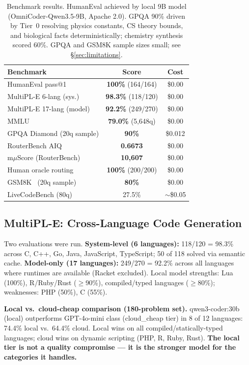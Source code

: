 \documentclass[11pt]{article}
\begin{document}
\begin{table}[t]
\centering
\small
\begin{tabular}{lcc}
\toprule
\textbf{Benchmark} & \textbf{Score} & \textbf{Cost} \\
\midrule
HumanEval pass@1~\cite{chen2021humaneval} & \textbf{100\%} (164/164) & \$0.00 \\
MultiPL-E 6-lang (sys.)~\cite{cassano2022multipl} & \textbf{98.3\%} (118/120) & \$0.00 \\
MultiPL-E 17-lang (model) & \textbf{92.2\%} (249/270) & \$0.00 \\
MMLU~\cite{hendrycks2021mmlu} & \textbf{79.0\%} (5,648q) & \$0.00 \\
GPQA Diamond (20q sample) & \textbf{90\%} & \$0.012 \\
RouterBench AIQ~\cite{withmartian2024routerbench} & \textbf{0.6673} & \$0.00 \\
m$\mu$Score (RouterBench) & \textbf{10,607} & \$0.00 \\
Human oracle routing & \textbf{100\%} (200/200) & \$0.00 \\
GSM8K~\cite{cobbe2021gsm8k} (20q sample) & \textbf{80\%} & \$0.00 \\
LiveCodeBench (80q) & 27.5\% & $\sim$\$0.05 \\
\bottomrule
\end{tabular}
\caption{Benchmark results. HumanEval achieved by local 9B model
(OmniCoder-Qwen3.5-9B, Apache 2.0). GPQA 90\% driven by Tier~0
resolving physics constants, CS theory bounds, and biological facts
deterministically; chemistry synthesis scored 60\%. GPQA and GSM8K
sample sizes small; see \S\ref{sec:limitations}.}
\label{tab:benchmarks}
\end{table}

\subsection{MultiPL-E: Cross-Language Code Generation}
\label{sec:multipl}

Two evaluations were run. \textbf{System-level (6 languages):} 118/120
= 98.3\% across C, C++, Go, Java, JavaScript, TypeScript; 50 of 118
solved via semantic cache. \textbf{Model-only (17 languages):} 249/270
= 92.2\% across all languages where runtimes are available (Racket
excluded). Local model strengths: Lua (100\%), R/Ruby/Rust ($\geq$90\%),
compiled/typed languages ($\geq$80\%); weaknesses: PHP (50\%), C
(55\%).

\textbf{Local vs.\ cloud-cheap comparison (180-problem set).}
qwen3-coder:30b (local) outperforms GPT-4o-mini class (cloud\_cheap
tier) in 8 of 12 languages: 74.4\% local vs.\ 64.4\% cloud. Local wins
on all compiled/statically-typed languages; cloud wins on dynamic
scripting (PHP, R, Ruby, Rust). \textbf{The local tier is not a quality
compromise --- it is the stronger model for the categories it handles.}
\end{document}
